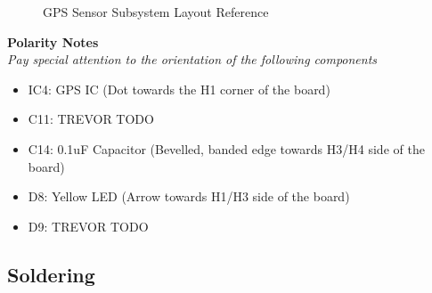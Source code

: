 \documentclass{article}
\begin{document}
\begin{figure}[H]
    \centering
        \qquad
        \caption{GPS Sensor Subsystem Layout Reference}%
    \label{fig:gps-layout}%
\end{figure}

\noindent \textbf{Polarity Notes}\\
\noindent \textit{Pay special attention to the orientation of the following components}
\begin{itemize}
  \item IC4: GPS IC (Dot towards the H1 corner of the board)
  \item C11: TREVOR TODO
  \item C14: 0.1uF Capacitor (Bevelled, banded edge towards H3/H4 side of the board)
  \item D8: Yellow LED (Arrow towards H1/H3 side of the board)
  \item D9: TREVOR TODO
\end{itemize}

\subsection{Soldering}
\end{document}
